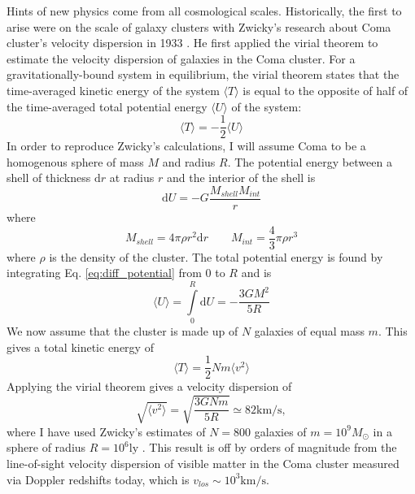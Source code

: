 Hints of new physics come from all cosmological scales. Historically, the first to arise were on the scale of galaxy clusters with Zwicky's research about Coma cluster's velocity dispersion in 1933 \cite{Zwicky_1933}. He first applied the virial theorem to estimate the velocity dispersion of galaxies in the Coma cluster. For a gravitationally-bound system in equilibrium, the virial theorem states that the time-averaged kinetic energy of the system \(\langle T \rangle \) is equal to the opposite of half of the time-averaged total potential energy \(\langle U \rangle \) of the system:
\begin{equation}\label{eq:diff_potential}
	\langle T \rangle = - \frac{1}{2} \langle U \rangle 
\end{equation}
In order to reproduce Zwicky's calculations, I will assume Coma to be a homogenous sphere of mass \(M\) and radius \(R\). The potential energy between a shell of thickness \(\mathrm{d} r\) at radius \(r\) and the interior of the shell is
\begin{equation}
	\mathrm{d} U = - G \frac{M_{shell} M_{int} }{r}
\end{equation}
where
\begin{equation}
	M_{shell} = 4\pi \rho r^2 \mathrm{d} r
	\qquad
	M_{int } = \frac{4}{3} \pi \rho r^3
\end{equation}
where \(\rho \) is the density of the cluster. The total potential energy is found by integrating Eq. \eqref{eq:diff_potential} from \(0\) to \(R\) and is
\begin{equation}\label{eq:potential}
	\langle U \rangle = \int\limits_0^R \mathrm{d} U = - \frac{3GM^2}{5R}
\end{equation}
We now assume that the cluster is made up of \(N\) galaxies of equal mass \(m\). This gives a total kinetic energy of
\begin{equation}\label{eq:kinetic}
	\langle T \rangle = \frac{1}{2} Nm \langle v^2 \rangle 
\end{equation}
Applying the virial theorem gives a velocity dispersion of
\begin{equation}\label{eq:dispersion}
	\sqrt{\langle v^2 \rangle } = \sqrt{\frac{3GNm}{5R}} \simeq 82 \mathrm{km / s}, 
\end{equation}
where I have used Zwicky's estimates of \(N=800\) galaxies of \(m = 10^9 M_\odot\) in a sphere of radius \(R=10^6 \mathrm{ly} \) \cite{Bertone_2018}. This result is off by orders of magnitude from the line-of-sight velocity dispersion of visible matter in the Coma cluster measured via Doppler redshifts today, which is \(v_{los} \sim 10^3 \mathrm{km /s} \).

